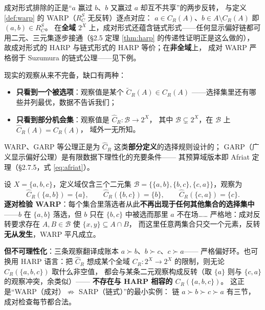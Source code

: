 \begin{remark}
成对形式排除的正是“$a$ 赢过 $b$、$b$ 又赢过 $a$ 却互不共享”的两步反转，
与定义 \ref{def:warp} 的 WARP（$R_C^S$ 无反转）逐点对应：
$a\in C_R(A)$、$b\in A\setminus C_R(A)$ 即 $(a,b)\in R_C^S$。
在\textbf{全域} $2^X$ 上，成对形式还蕴含链式形式——任何显示偏好链都可
用二元、三元集逐步接通（§2.5 定理 \ref{thm:harp} 的传递性证明正是这么做的），
故成对形式的 HARP 与链式形式的 HARP 等价；在\textbf{非全域}上，
成对 WARP 严格弱于 Suzumura 的链式公理——见下例。
\end{remark}

\begin{remark}[有限数据的两种缺口]
现实的观察从来不完备，缺口有两种：
\begin{itemize}
  \item \textbf{只看到一个被选项}：观察值是某个 $\widetilde{C}_R(A)\in C_R(A)$
  ——选择集里还有哪些并列最优，数据不告诉我们；
  \item \textbf{只看到部分机会集}：观察值是 $\widehat{C}_R:\mathcal{B}\to 2^X$，
  其中 $\mathcal{B}\subsetneq 2^X$，在 $\mathcal{B}$ 上 $\widehat{C}_R(A)=C_R(A)$，
  域外一无所知。
\end{itemize}
WARP、GARP 等公理正是为 $\widehat{C}_R$ 这类\textbf{部分定义}的选择规则设计的；
GARP（广义显示偏好公理）是有限数据下理性化的充要条件——
其预算域版本即 Afriat 定理（§2.7.5，式 \eqref{eq:afriat}）。
\end{remark}

\begin{example}\label{ex:warpnotsuff}
设 $X=\{a,b,c\}$，定义域仅含三个二元集
$\mathcal{B}=\bigl\{\{a,b\},\{b,c\},\{c,a\}\bigr\}$，观察为
\[
\widehat{C}_R(\{a,b\})=\{a\},\qquad
\widehat{C}_R(\{b,c\})=\{b\},\qquad
\widehat{C}_R(\{c,a\})=\{c\}.
\]
\textbf{逐对检验 WARP}：每个集合里落选者从此\textbf{不再出现于任何其他集合的选择集中}
——$b$ 在 $\{a,b\}$ 落选，但 $b$ 只在 $\{b,c\}$ 中被选而那里 $a$ 不在场……
严格地：成对反转要求存在 $A,B\in\mathcal{B}$ 使 $\{x,y\}\subseteq A\cap B$，
而这里任意两集合只交一个元素，反转\textbf{无从发生}，WARP 平凡成立。

\textbf{但不可理性化}：三条观察翻译成账本 $a\succ b$、$b\succ c$、$c\succ a$——
严格偏好环。也可换用 HARP 语言：把 $\widehat{C}_R$ 想成某个全域
$C_R: 2^X\to 2^X$ 的限制，则无论 $C_R(\{a,b,c\})$ 取什么非空值，
都会与某条二元观察构成反转（取 $\{a\}$ 则与 $\{c,a\}$ 的观察冲突，余类似）——
\textbf{不存在与 HARP 相容的 $C_R(\{a,b,c\})$}。
这正是“WARP（成对）$\not\Rightarrow$ SARP（链式）”的最小实例：
链 $a\succ b\succ c\succ a$ 有三节，成对检查每节都合法。
\end{example}

